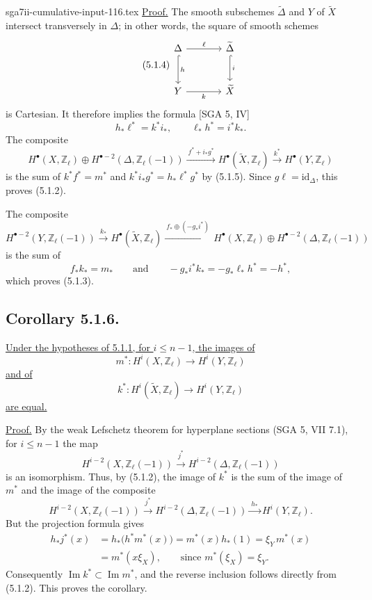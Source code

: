 \begin{filecontents*}{sga7ii-cumulative-input-116.tex}
\underline{Proof.}
The smooth subschemes $\widetilde\Delta$ and $Y$ of $\widetilde X$
intersect transversely in $\Delta$; in other words, the square of smooth
schemes
\begin{equation}\tag{5.1.4}
\begin{tikzcd}[column sep=large,row sep=large]
\Delta\arrow[r,"\ell"]\arrow[d,hook,"h"]
  &\widetilde\Delta\arrow[d,hook,"i"]\\
Y\arrow[r,"k"']&\widetilde X
\end{tikzcd}
\end{equation}
is Cartesian.  It therefore implies the formula [SGA 5, IV]
\begin{equation}\tag{5.1.5}
h_*\ell^*=k^*i_* ,\qquad \ell_*h^*=i^*k_*.
\end{equation}
The composite
\[
H^\bullet(X,\mathbb Z_\ell)\oplus
H^{\bullet-2}(\Delta,\mathbb Z_\ell(-1))
\xrightarrow{\ f^*+i_*g^*\ }
H^\bullet(\widetilde X,\mathbb Z_\ell)
\xrightarrow{\ k^*\ }
H^\bullet(Y,\mathbb Z_\ell)
\]
is the sum of
$k^*f^*=m^*$ and
$k^*i_*g^*=h_*\ell^*g^*$ by (5.1.5).  Since
$g\ell=\mathrm{id}_\Delta$, this proves (5.1.2).

The composite
\[
H^{\bullet-2}(Y,\mathbb Z_\ell(-1))
\xrightarrow{\ k_*\ }
H^\bullet(\widetilde X,\mathbb Z_\ell)
\xrightarrow{\ f_*\oplus(-g_*i^*)\ }
H^\bullet(X,\mathbb Z_\ell)\oplus
H^{\bullet-2}(\Delta,\mathbb Z_\ell(-1))
\]
is the sum of
\[
f_*k_*=m_*
\qquad\text{and}\qquad
-g_*i^*k_*=-g_*\ell_*h^*=-h^*,
\]
which proves (5.1.3).

\subsection*{Corollary 5.1.6.}
\underline{Under the hypotheses of 5.1.1, for $i\leq n-1$, the images
of}
\[
m^*:H^i(X,\mathbb Z_\ell)\longrightarrow H^i(Y,\mathbb Z_\ell)
\]
\underline{and of}
\[
k^*:H^i(\widetilde X,\mathbb Z_\ell)
   \longrightarrow H^i(Y,\mathbb Z_\ell)
\]
\underline{are equal.}

\underline{Proof.}
By the weak Lefschetz theorem for hyperplane sections (SGA 5, VII 7.1),
for $i\leq n-1$ the map
\begin{equation}\tag{5.1.7}
H^{i-2}(X,\mathbb Z_\ell(-1))
\xrightarrow{\ j^*\ }
H^{i-2}(\Delta,\mathbb Z_\ell(-1))
\end{equation}
is an isomorphism.  Thus, by (5.1.2), the image of $k^*$ is the sum of
the image of $m^*$ and the image of the composite
\[
H^{i-2}(X,\mathbb Z_\ell(-1))
\xrightarrow{\ j^*\ }
H^{i-2}(\Delta,\mathbb Z_\ell(-1))
\xrightarrow{\ h_*\ }
H^i(Y,\mathbb Z_\ell).
\]
But the projection formula gives
\[
\begin{aligned}
h_*j^*(x)
 &=h_*\bigl(h^*m^*(x)\bigr)
  =m^*(x)h_*(1)
  =\xi_Y\,m^*(x)\\
 &=m^*(x\xi_X),
 \qquad\text{since }m^*(\xi_X)=\xi_Y.
\end{aligned}
\]
Consequently $\operatorname{Im}k^*\subset\operatorname{Im}m^*$, and
the reverse inclusion follows directly from (5.1.2).  This proves the
corollary.
\end{filecontents*}
